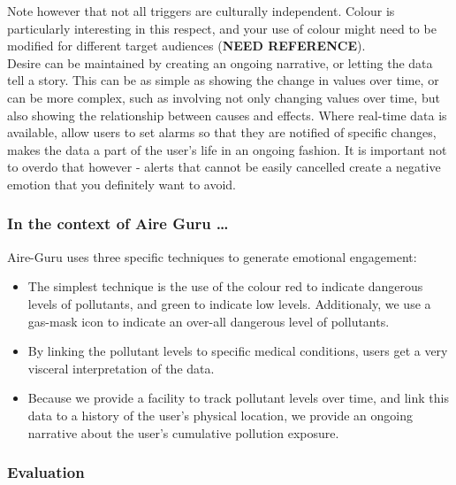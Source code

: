 Note however that not all triggers are culturally independent. Colour is particularly interesting in this respect, and your use of colour might
need to be modified for different target audiences (\textbf{NEED REFERENCE}). \\

Desire can be maintained by creating an ongoing narrative, or letting the data tell a story. This can be as simple as showing the change in 
values over time, or can be more complex, such as involving not only changing values over time, but also showing the relationship between causes and
effects. Where real-time data is available, allow users to set alarms so that they are notified of specific changes, makes the data a part of the user's
life in an ongoing fashion. It is important not to overdo that however - alerts that cannot be easily cancelled create a negative emotion that you
definitely want to avoid. \\

\subsubsection*{In the context of Aire Guru \ldots}

Aire-Guru uses three specific techniques to generate emotional engagement:

\begin{itemize}

    \item The simplest technique is the use of the colour red to indicate dangerous levels of pollutants, and green to indicate low levels.
    Additionaly, we use a gas-mask icon to indicate an over-all dangerous level of pollutants.

    \item By linking the pollutant levels to specific medical conditions, users get a very visceral interpretation of the data.
    
    \item Because we provide a facility to track pollutant levels over time, and link this data to a history of the user's physical location, we provide
    an ongoing narrative about the user's cumulative pollution exposure.

\end{itemize}

\subsubsection*{Evaluation}  

\begin{itemize}
    \done
    \crossed
\end{itemize}